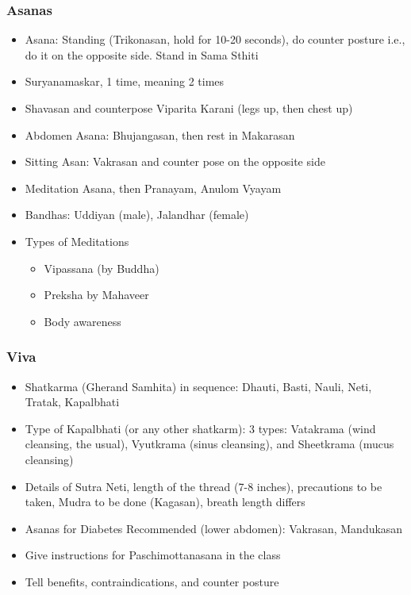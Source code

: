 \begin{frame}[fragile]\frametitle{Asanas}
    \begin{itemize}
        \item Asana: Standing (Trikonasan, hold for 10-20 seconds), do counter posture i.e., do it on the opposite side. Stand in Sama Sthiti
        \item Suryanamaskar, 1 time, meaning 2 times
        \item Shavasan and counterpose Viparita Karani (legs up, then chest up)
        \item Abdomen Asana: Bhujangasan, then rest in Makarasan
        \item Sitting Asan: Vakrasan and counter pose on the opposite side
        \item Meditation Asana, then Pranayam, Anulom Vyayam
        \item Bandhas: Uddiyan (male), Jalandhar (female)
		\item Types of Meditations
			\begin{itemize}
				\item Vipassana (by Buddha)
				\item Preksha by Mahaveer
				\item Body awareness
			\end{itemize}
    \end{itemize}
		
\end{frame}
\begin{frame}[fragile]\frametitle{Viva}
    \begin{itemize}
        \item Shatkarma (Gherand Samhita) in sequence: Dhauti, Basti, Nauli, Neti, Tratak, Kapalbhati
        \item Type of Kapalbhati (or any other shatkarm): 3 types: Vatakrama (wind cleansing, the usual), Vyutkrama (sinus cleansing), and Sheetkrama (mucus cleansing)
        \item Details of Sutra Neti, length of the thread (7-8 inches), precautions to be taken, Mudra to be done (Kagasan), breath length differs
        \item Asanas for Diabetes Recommended (lower abdomen): Vakrasan, Mandukasan
        \item Give instructions for Paschimottanasana in the class
        \item Tell benefits, contraindications, and counter posture
    \end{itemize}
\end{frame}

